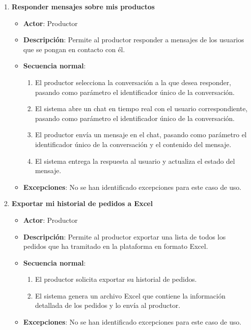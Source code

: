 \begin{enumerate}[label=UC-\protect\twodigits{\arabic*}:, align=left, leftmargin=*]
\item \textbf{Responder mensajes sobre mis productos}
\begin{itemize}
\item \textbf{Actor}: Productor
\item \textbf{Descripción}: Permite al productor responder a mensajes de los usuarios que se pongan en contacto con él.
\item \textbf{Secuencia normal}:
\begin{enumerate}[label={\arabic*}:]
\item El productor selecciona la conversación a la que desea responder, pasando como parámetro el identificador único de la conversación.
\item El sistema abre un chat en tiempo real con el usuario correspondiente, pasando como parámetro el identificador único de la conversación.
\item El productor envía un mensaje en el chat, pasando como parámetro el identificador único de la conversación y el contenido del mensaje.
\item El sistema entrega la respuesta al usuario y actualiza el estado del mensaje.
\end{enumerate}
\item \textbf{Excepciones}: No se han identificado excepciones para este caso de uso.
\end{itemize}

\item \textbf{Exportar mi historial de pedidos a Excel}
\begin{itemize}
\item \textbf{Actor}: Productor
\item \textbf{Descripción}: Permite al productor exportar una lista de todos los pedidos que ha tramitado en la plataforma en formato Excel.
\item \textbf{Secuencia normal}:
\begin{enumerate}[label={\arabic*}:]
\item El productor solicita exportar su historial de pedidos.
\item El sistema genera un archivo Excel que contiene la información detallada de los pedidos y lo envía al productor.
\end{enumerate}
\item \textbf{Excepciones}: No se han identificado excepciones para este caso de uso.
\end{itemize}


\end{enumerate}